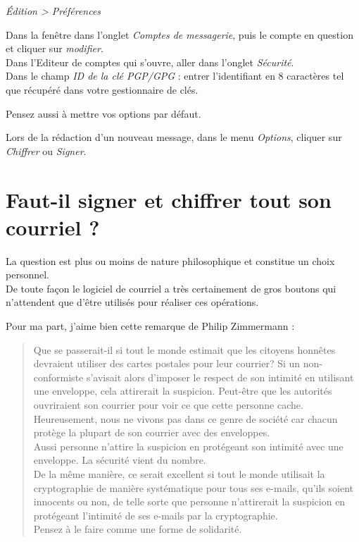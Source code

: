 \emph{Édition \textgreater{} Préférences}

Dans la fenêtre dans l'onglet \emph{Comptes de messagerie}, puis le
compte en question et cliquer sur \emph{modifier}.\\Dans l'Editeur de
comptes qui s'ouvre, aller dans l'onglet \emph{Sécurité}.\\Dans le champ
\emph{ID de la clé PGP/GPG} : entrer l'identifiant en 8 caractères tel
que récupéré dans votre gestionnaire de clés.

Pensez aussi à mettre vos options par défaut.

Lors de la rédaction d'un nouveau message, dans le menu \emph{Options},
cliquer sur \emph{Chiffrer} ou \emph{Signer}.

\section{Faut-il signer et chiffrer tout son courriel ?}\label{faut-il-signer-et-chiffrer-tout-son-courriel}

La question est plus ou moins de nature philosophique et constitue un
choix personnel.\\De toute façon le logiciel de courriel a très
certainement de gros boutons qui n'attendent que d'être utilisés pour
réaliser ces opérations.

Pour ma part, j'aime bien cette remarque de Philip Zimmermann :

\begin{quote}
Que se passerait-il si tout le monde estimait que les citoyens honnêtes
devraient utiliser des cartes postales pour leur courrier? Si un
non-conformiste s'avisait alors d'imposer le respect de son intimité en
utilisant une enveloppe, cela attirerait la suspicion. Peut-être que les
autorités ouvriraient son courrier pour voir ce que cette personne
cache.\\Heureusement, nous ne vivons pas dans ce genre de société car
chacun protège la plupart de son courrier avec des enveloppes.\\Aussi
personne n'attire la suspicion en protégeant son intimité avec une
enveloppe. La sécurité vient du nombre.\\De la même manière, ce serait
excellent si tout le monde utilisait la cryptographie de manière
systématique pour tous ses e-mails, qu'ils soient innocents ou non, de
telle sorte que personne n'attirerait la suspicion en protégeant
l'intimité de ses e-mails par la cryptographie.\\Pensez à le faire comme
une forme de solidarité.
\end{quote}

